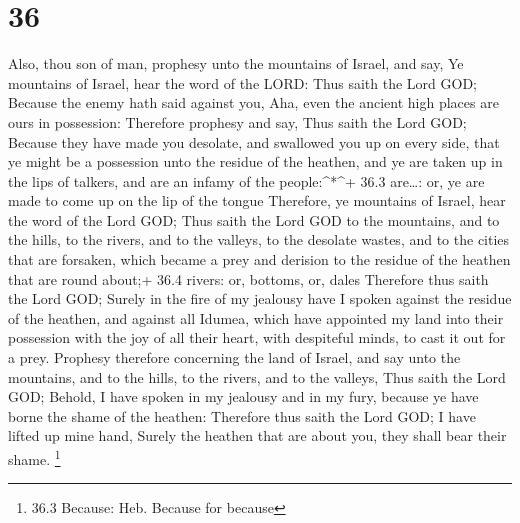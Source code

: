 \hypertarget{section-35}{%
\section{36}\label{section-35}}

 Also, thou son of man, prophesy unto the mountains of
Israel, and say, Ye mountains of Israel, hear the word of the LORD:
 Thus saith the Lord GOD; Because the enemy hath said
against you, Aha, even the ancient high places are ours in possession:
 Therefore prophesy and say, Thus saith the Lord GOD;
Because they have made you desolate, and swallowed you up on every side,
that ye might be a possession unto the residue of the heathen, and ye
are taken up in the lips of talkers, and are an infamy of the
people:\^{}*\^{}+ 36.3 are\ldots: or, ye are made to come up on the lip
of the tongue  Therefore, ye mountains of Israel, hear the
word of the Lord GOD; Thus saith the Lord GOD to the mountains, and to
the hills, to the rivers, and to the valleys, to the desolate wastes,
and to the cities that are forsaken, which became a prey and derision to
the residue of the heathen that are round about;+ 36.4 rivers: or,
bottoms, or, dales  Therefore thus saith the Lord GOD;
Surely in the fire of my jealousy have I spoken against the residue of
the heathen, and against all Idumea, which have appointed my land into
their possession with the joy of all their heart, with despiteful minds,
to cast it out for a prey.  Prophesy therefore concerning
the land of Israel, and say unto the mountains, and to the hills, to the
rivers, and to the valleys, Thus saith the Lord GOD; Behold, I have
spoken in my jealousy and in my fury, because ye have borne the shame of
the heathen:  Therefore thus saith the Lord GOD; I have
lifted up mine hand, Surely the heathen that are about you, they shall
bear their shame. \footnote{36.3 Because: Heb. Because for because}

